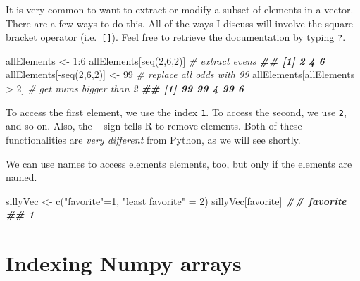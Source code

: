 \documentclass[
  12pt,
  krantz2]{krantz}
\makeatletter
\newenvironment{Shaded}{\begin{snugshade}}{\end{snugshade}}
\newcommand{\CommentTok}[1]{\textcolor[rgb]{0.37,0.37,0.37}{\textit{#1}}}
\newcommand{\DecValTok}[1]{\textcolor[rgb]{0.06,0.06,0.06}{#1}}
\newcommand{\DocumentationTok}[1]{\textcolor[rgb]{0.37,0.37,0.37}{\textbf{\textit{#1}}}}
\newcommand{\FunctionTok}[1]{\textcolor[rgb]{0,0,0}{#1}}
\newcommand{\NormalTok}[1]{#1}
\newcommand{\OtherTok}[1]{\textcolor[rgb]{0.37,0.37,0.37}{#1}}
\newcommand{\SpecialCharTok}[1]{\textcolor[rgb]{0,0,0}{#1}}
\newcommand{\StringTok}[1]{\textcolor[rgb]{0.5,0.5,0.5}{#1}}
\newenvironment{kframe}{%
\medskip{}
\setlength{\fboxsep}{.8em}
 \def\at@end@of@kframe{}%
 \ifinner\ifhmode%
  \def\at@end@of@kframe{\end{minipage}}%
  \begin{minipage}{\columnwidth}%
 \fi\fi%
 \def\FrameCommand##1{\hskip\@totalleftmargin \hskip-\fboxsep
 \colorbox{shadecolor}{##1}\hskip-\fboxsep
     \hskip-\linewidth \hskip-\@totalleftmargin \hskip\columnwidth}%
 \MakeFramed {\advance\hsize-\width
   \@totalleftmargin\z@ \linewidth\hsize
   \@setminipage}}%
 {\par\unskip\endMakeFramed%
 \at@end@of@kframe}
\renewenvironment{Shaded}{\begin{kframe}}{\end{kframe}}
\makeatother
\begin{document}
It is very common to want to extract or modify a subset of elements in a vector. There are a few ways to do this. All of the ways I discuss will involve the square bracket operator (i.e.~\texttt{{[}{]}}). Feel free to retrieve the documentation by typing \texttt{?\textquotesingle{}{[}\textquotesingle{}}.

\begin{Shaded}
\begin{Highlighting}[]
\NormalTok{allElements }\OtherTok{\textless{}{-}} \DecValTok{1}\SpecialCharTok{:}\DecValTok{6}
\NormalTok{allElements[}\FunctionTok{seq}\NormalTok{(}\DecValTok{2}\NormalTok{,}\DecValTok{6}\NormalTok{,}\DecValTok{2}\NormalTok{)] }\CommentTok{\# extract evens}
\DocumentationTok{\#\# [1] 2 4 6}
\NormalTok{allElements[}\SpecialCharTok{{-}}\FunctionTok{seq}\NormalTok{(}\DecValTok{2}\NormalTok{,}\DecValTok{6}\NormalTok{,}\DecValTok{2}\NormalTok{)] }\OtherTok{\textless{}{-}} \DecValTok{99} \CommentTok{\# replace all odds with 99}
\NormalTok{allElements[allElements }\SpecialCharTok{\textgreater{}} \DecValTok{2}\NormalTok{] }\CommentTok{\# get nums bigger than 2}
\DocumentationTok{\#\# [1] 99 99  4 99  6}
\end{Highlighting}
\end{Shaded}

To access the first element, we use the index \texttt{1}. To access the second, we use \texttt{2}, and so on. Also, the \texttt{-} sign tells R to remove elements. Both of these functionalities are \emph{very different} from Python, as we will see shortly.

We can use names to access elements elements, too, but only if the elements are named.

\begin{Shaded}
\begin{Highlighting}[]
\NormalTok{sillyVec }\OtherTok{\textless{}{-}} \FunctionTok{c}\NormalTok{(}\StringTok{"favorite"}\OtherTok{=}\DecValTok{1}\NormalTok{, }\StringTok{"least favorite"} \OtherTok{=} \DecValTok{2}\NormalTok{)}
\NormalTok{sillyVec[}\StringTok{\textquotesingle{}favorite\textquotesingle{}}\NormalTok{]}
\DocumentationTok{\#\# favorite }
\DocumentationTok{\#\#        1}
\end{Highlighting}
\end{Shaded}

\hypertarget{indexing-numpy-arrays}{%
\section{Indexing Numpy arrays}\label{indexing-numpy-arrays}}
\end{document}
